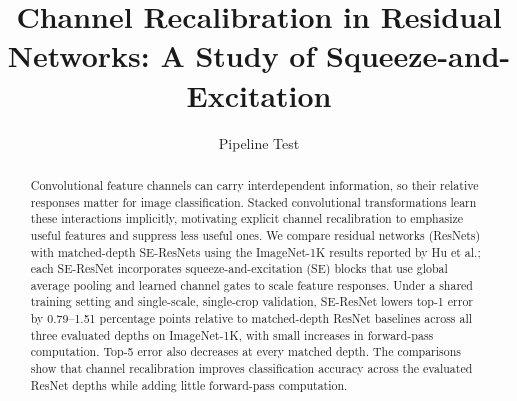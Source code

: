 \documentclass[11pt]{article}
\title{Channel Recalibration in Residual Networks: A Study of Squeeze-and-Excitation}
\author{Pipeline Test}
\date{}
\begin{document}
\maketitle
\begin{abstract}
Convolutional feature channels can carry interdependent information, so their relative responses matter for image classification. Stacked convolutional transformations learn these interactions implicitly, motivating explicit channel recalibration to emphasize useful features and suppress less useful ones. We compare residual networks (ResNets) with matched-depth SE-ResNets using the ImageNet-1K results reported by Hu et al.; each SE-ResNet incorporates squeeze-and-excitation (SE) blocks that use global average pooling and learned channel gates to scale feature responses. Under a shared training setting and single-scale, single-crop validation, SE-ResNet lowers top-1 error by 0.79--1.51 percentage points relative to matched-depth ResNet baselines across all three evaluated depths on ImageNet-1K, with small increases in forward-pass computation. Top-5 error also decreases at every matched depth. The comparisons show that channel recalibration improves classification accuracy across the evaluated ResNet depths while adding little forward-pass computation.
\end{abstract}









\end{document}
